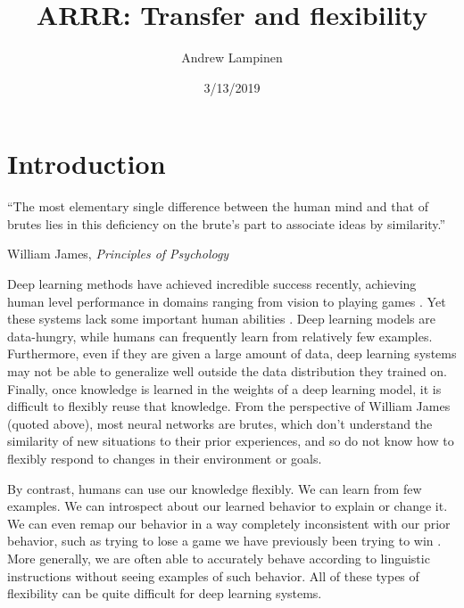 \documentclass[11pt]{article}
\begin{document}
 
\title{ARRR: Transfer and flexibility}
\author{Andrew Lampinen}
\date{3/13/2019}
\maketitle

\newpage
\tableofcontents

\newpage
\section{Introduction}
\epigraph{``The most elementary single difference between the human mind and that of brutes lies in this deficiency on the brute's part to associate ideas by similarity.''}{William James, \textit{Principles of Psychology}}
Deep learning methods have achieved incredible success recently, achieving human level performance in domains ranging from vision \citep[e.g.]{Szegedy2015} to playing games \citep[e.g.]{Silver2016}. Yet these systems lack some important human abilities \citep[e.g.]{Lake2016}. Deep learning models are data-hungry, while humans can frequently learn from relatively few examples. Furthermore, even if they are given a large amount of data, deep learning systems may not be able to generalize well outside the data distribution they trained on. Finally, once knowledge is learned in the weights of a deep learning model, it is difficult to flexibly reuse that knowledge. From the perspective of William James (quoted above), most neural networks are brutes, which don't understand the similarity of new situations to their prior experiences, and so do not know how to flexibly respond to changes in their environment or goals. \par
By contrast, humans can use our knowledge flexibly. We can learn from few examples. We can introspect about our learned behavior to explain or change it. We can even remap our behavior in a way completely inconsistent with our prior behavior, such as trying to lose a game we have previously been trying to win \citep{Lake2016}. More generally, we are often able to accurately behave according to linguistic instructions without seeing examples of such behavior. All of these types of flexibility can be quite difficult for deep learning systems. \par 
\end{document}

